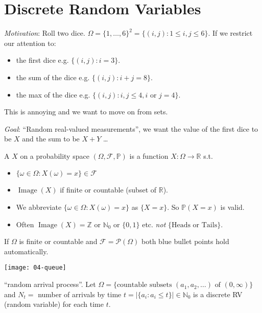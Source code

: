 \section{Discrete Random Variables}
\emph{Motivation}: Roll two dice.
$\Omega = \{1, \dots, 6\}^2 = \{(i, j) : 1 \leq i, j \leq 6\}.$
If we restrict our attention to:
\begin{itemize}
    \item the first dice e.g. $\{(i, j) : i = 3\}$.
    \item the sum of the dice e.g. $\{(i, j) : i + j = 8\}$.
    \item the max of the dice e.g. $\{(i, j) : i, j \leq 4, i \text{ or } j = 4\}$.
\end{itemize} 
This is annoying and we want to move on from sets.

\emph{Goal}: ``Random real-valued measurements'', we want the value of the first dice to be $X$ and the sum to be $X + Y$ \dots

\begin{definition}
    A  $X$ on a probability space $(\Omega, \mathcal{F}, \mathbb{P})$ is a function $X : \Omega \to \mathbb{R}$ \color{blue} s.t. 
    \begin{itemize}
        \item $\{ \omega \in \Omega : X(\omega) = x\} \in \mathcal{F}$
        \item $\operatorname{Image}(X)$ if finite or countable (subset of $\mathbb{R}$).
    \end{itemize}
    \color{red} 
    \begin{itemize}
        \item We abbreviate $\{ \omega \in \Omega : X(\omega) = x\}$ as $\{X = x\}$. So $\mathbb{P}(X = x)$ is valid.
        \item Often $\operatorname{Image}(X) = \mathbb{Z}$ or $\mathbb{N}_0$ or $\{0, 1\}$ etc. \emph{not} $\{\text{Heads or Tails}\}$. 
    \end{itemize} \color{black}
    If $\Omega$ is finite or countable and $\mathcal{F} = \mathcal{P}(\Omega)$ both blue bullet points hold automatically.
\end{definition} 

\begin{example} \mbox{}
    {\par \centering \texttt{[image: 04-queue]} \par}
    ``random arrival process''.
    Let $\Omega = \{\text{countable subsets } (a_1, a_2, \dots) \text{ of } (0, \infty)\}$ and $N_t =$ number of arrivals by time $t = |\{a_i : a_i \leq t\}| \in \mathbb{N}_0$ is a discrete RV (random variable) for each time $t$.
\end{example} 

